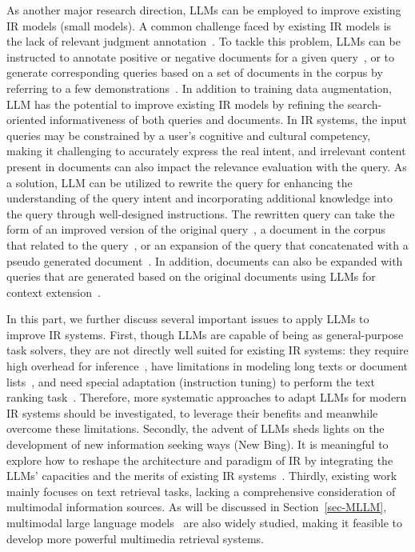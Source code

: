 {As another major research direction, LLMs can be employed to improve existing IR models (\eg small models).  
A common challenge faced by existing IR models is the lack of relevant judgment annotation~\cite{Qu-NAACL-2021-rocketqa, Ren-ACL-2021-PAIR}. 
To tackle this problem, LLMs can be instructed to annotate positive or negative documents for a given query~\cite{peng-arxiv-2023-soft}, or to generate corresponding queries based on a set of documents in the corpus by referring to a few demonstrations~\cite{Dai-ICLR-2023-promptagator, askari-arxiv-2023-generating}.
In addition to training data augmentation, LLM has the potential to improve existing IR models by refining the search-oriented informativeness of both queries and documents.   
In IR systems, the input queries may be constrained by a user's cognitive and cultural competency, making it challenging to accurately  express the real intent, and irrelevant content  present in documents can also impact the relevance evaluation with the query.
As a solution, LLM can be utilized to rewrite the query for enhancing the understanding of the query intent and incorporating additional knowledge into the query through well-designed instructions. The rewritten query can take the form of an improved version of the original query~\cite{mao-arxiv-2023-large}, {a document in the corpus that related to the query~\cite{Gao-ACL-2023-precise}, or an expansion of the query that concatenated with a pseudo generated document~\cite{Wang-arxiv-2023-query2doc}.} 
In addition, documents can also be expanded with queries that are generated based on the original documents using LLMs for context extension~\cite{ma-arxiv-2023-pre}.}



{
In this part, we further discuss several important issues to apply LLMs to improve IR  systems. 
First, though LLMs are capable of being as general-purpose task solvers, they are not directly well suited for existing IR systems: they require high overhead for inference~\cite{sun-arxiv-2023-chatgpt, Ma-arxiv-2023-fine}, have limitations in modeling long texts or document lists~\cite{ma-arxiv-2023-zero}, and need special adaptation (\eg instruction tuning) to perform the text ranking task~\cite{sun-arxiv-2023-instruction}.  
Therefore, more systematic approaches to adapt LLMs for modern IR systems should be investigated, to leverage their benefits and meanwhile overcome these limitations. 
Secondly, the advent of LLMs sheds lights on the development of new information seeking ways (\eg New Bing). 
It is meaningful to explore how to reshape the architecture and paradigm of IR by integrating the LLMs' capacities and the merits of existing IR systems~\cite{wang-arxiv-2023-large}. 
Thirdly, existing work mainly focuses on text retrieval tasks, lacking a comprehensive consideration of multimodal information sources. 
As will be discussed in Section~\ref{sec-MLLM}, multimodal large language models~\cite{Li-arXiv-2023-Multimodal} 
are also widely studied, making it feasible to develop more powerful multimedia retrieval systems. 
}




